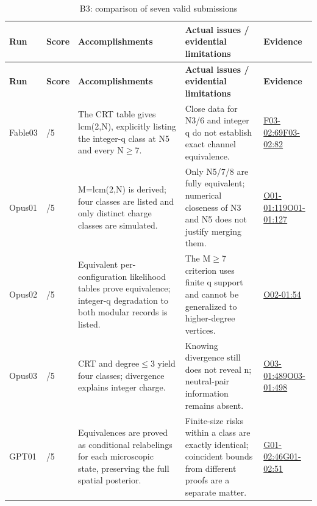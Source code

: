 \documentclass[11pt,a4paper]{article}
\begin{document}
{\fontsize{9.0}{12.6}\selectfont
\setlength{\tabcolsep}{2.5pt}
\begin{longtable}{>{\raggedright\arraybackslash}p{}>{\raggedright\arraybackslash}p{}>{\raggedright\arraybackslash}p{}>{\raggedright\arraybackslash}p{}>{\raggedright\arraybackslash}p{}}
\caption{B3: comparison of seven valid submissions}\\
\toprule
\textbf{Run} & \textbf{Score} & \textbf{Accomplishments} & \textbf{Actual issues /\allowbreak{} evidential limitations} & \textbf{Evidence}\tabularnewline
\midrule
\endfirsthead
\toprule
\textbf{Run} & \textbf{Score} & \textbf{Accomplishments} & \textbf{Actual issues /\allowbreak{} evidential limitations} & \textbf{Evidence}\tabularnewline
\midrule
\endhead
{}Fable03 & 5/\allowbreak{}5 & The CRT table gives lcm(2,\allowbreak{}N),\allowbreak{} explicitly listing the integer-q class at N5 and every N\ensuremath{\geq}7. & Close data for N3/\allowbreak{}6 and integer q do not establish exact channel equivalence. & \hyperref[src:F03-02]{F03-02:69}\newline \hyperref[src:F03-02]{F03-02:82}\tabularnewline
{}Opus01 & 5/\allowbreak{}5 & M=lcm(2,\allowbreak{}N) is derived; four classes are listed and only distinct charge classes are simulated. & Only N5/\allowbreak{}7/\allowbreak{}8 are fully equivalent; numerical closeness of N3 and N5 does not justify merging them. & \hyperref[src:O01-01]{O01-01:119}\newline \hyperref[src:O01-01]{O01-01:127}\tabularnewline
{}Opus02 & 5/\allowbreak{}5 & Equivalent per-configuration likelihood tables prove equivalence; integer-q degradation to both modular records is listed. & The M\ensuremath{\geq}7 criterion uses finite q support and cannot be generalized to higher-degree vertices. & \hyperref[src:O02-01]{O02-01:54}\tabularnewline
{}Opus03 & 5/\allowbreak{}5 & CRT and degree\ensuremath{\leq}3 yield four classes; divergence explains integer charge. & Knowing divergence still does not reveal n; neutral-pair information remains absent. & \hyperref[src:O03-01]{O03-01:489}\newline \hyperref[src:O03-01]{O03-01:498}\tabularnewline
{}GPT01 & 5/\allowbreak{}5 & Equivalences are proved as conditional relabelings for each microscopic state,\allowbreak{} preserving the full spatial posterior. & Finite-size risks within a class are exactly identical; coincident bounds from different proofs are a separate matter. & \hyperref[src:G01-02]{G01-02:46}\newline \hyperref[src:G01-02]{G01-02:51}\tabularnewline

\end{longtable}}
\end{document}
